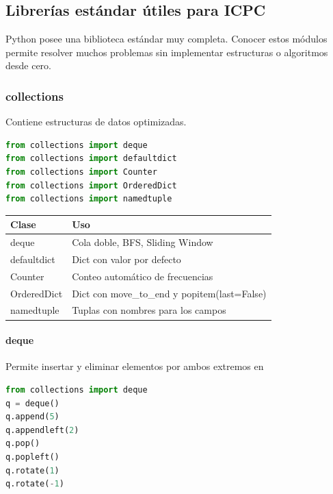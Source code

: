 \subsection{Librerías estándar útiles para ICPC}
\label{alg:2-6}

Python posee una biblioteca estándar muy completa. Conocer estos módulos permite resolver muchos problemas sin implementar estructuras o algoritmos desde cero.

\vspace{0.3cm}

\subsubsection{collections}

Contiene estructuras de datos optimizadas.

\begin{lstlisting}[language=Python]
from collections import deque
from collections import defaultdict
from collections import Counter
from collections import OrderedDict
from collections import namedtuple
\end{lstlisting}

\begin{center}
\begin{tabular}{|l|p{6cm}|}
\hline
Clase & Uso \\ \hline
deque & Cola doble, BFS, Sliding Window \\ \hline
defaultdict & Dict con valor por defecto \\ \hline
Counter & Conteo automático de frecuencias \\ \hline
OrderedDict & Dict con move\_to\_end y popitem(last=False) \\ \hline
namedtuple & Tuplas con nombres para los campos \\ \hline
\end{tabular}
\end{center}

\vspace{0.3cm}

\paragraph{deque}

Permite insertar y eliminar elementos por ambos extremos en 

\begin{lstlisting}[language=Python]
from collections import deque
q = deque()
q.append(5)
q.appendleft(2)
q.pop()
q.popleft()
q.rotate(1)
q.rotate(-1)
\end{lstlisting}

